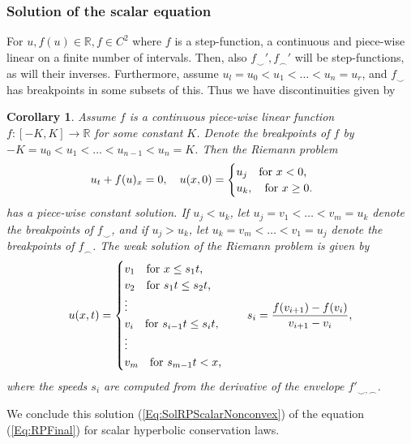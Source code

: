 \documentclass[10pt]{article}
\newtheorem{corollary}{Corollary}[theorem]
\numberwithin{equation}{section}
\begin{document}
\subsubsection{Solution of the scalar equation}
For $u, f(u) \in \mathbb{R}, f \in C^2$ where $f$ is a step-function, a continuous and piece-wise linear on a finite number of intervals. Then, also $f_{\smile}',f_{\frown}'$ will be step-functions, as will their inverses. Furthermore, assume $u_l = u_0 < u_1 < \dots < u_n = u_r$, and $f_\smile$ has breakpoints in some subsets of this. Thus we have discontinuities given by 
\begin{corollary}
Assume $f$ is a continuous piece-wise linear function $f: [-K, K] \rightarrow \mathbb{R}$ for some constant $K$. Denote the breakpoints of $f$ by $-K = u_0 < u_1 < \dots < u_{n-1} < u_n = K$. Then the Riemann problem 
\begin{equation*}
    u_t + f(u)_x = 0, \quad  u(x, 0) = \begin{cases} u_j \quad \text{for $ x < 0$,} \\ u_k, \quad \text{for $ x \geq 0$. } \end{cases}
\end{equation*}
has a piece-wise constant solution. 
If $u_j < u_k$, let $u_j = v_1 < \dots <v_m = u_k$ denote the breakpoints of $f_\smile$, and if $u_j > u_k$, let $u_k = v_m < \dots <v_1 = u_j$ denote the breakpoints of $f_\frown$. The weak solution of the Riemann problem is given by 
\begin{equation}
    u(x,t ) = \begin{cases}
    v_1 \quad \text{for $ x \leq s_1t$, } \\
    v_2 \quad \text{for $ s_1t \leq s_2 t$,} \\
    \vdots \\
    v_i \quad \text{for $ s_{i-1}t \leq s_i t $,} \\
    \vdots \\
    v_m \quad \text{for $ s_{m-1}t < x $,}
    \end{cases}\\
    \quad  s_i = \frac{f(v_{i+1}) - f(v_i) }{v_{i+1} - v_i},
    \label{Eq:SolRPScalarNonconvex}
\end{equation}
where the speeds $s_i$ are computed from the derivative of the envelope $f'_{\smile, \frown}$.
\end{corollary}

We conclude this solution (\ref{Eq:SolRPScalarNonconvex}) of the equation (\ref{Eq:RPFinal}) for scalar hyperbolic conservation laws. 
\end{document}
